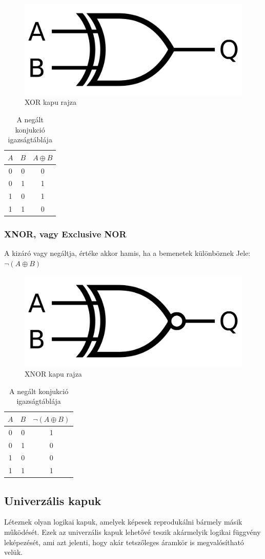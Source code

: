 \documentclass[
]{thesis-ekf}
\theoremstyle{definition}
\theoremstyle{remark}
\begin{document}
\begin{figure}[H]
	\centering
	\includegraphics[width=0.3\linewidth]{xor}
	\caption{XOR kapu rajza}
	\label{fig:xor}
\end{figure}


\begin{table}[H]
	\centering
	\begin{tabular}{c|c|c}
		$A$ & $B$ & $A \oplus B$\\               
		\hline
		0 & 0 & 0\\
		0 & 1 & 1\\
		1 & 0 & 1\\
		1 & 1 & 0
	\end{tabular}
	\caption{A negált konjukció igazságtáblája}
\end{table}


\subsubsection{XNOR, vagy Exclusive NOR}
A kizáró vagy negáltja, értéke akkor hamis, ha a bemenetek különböznek Jele: $\neg (A \oplus B)$

\begin{figure}[H]
	\centering
	\includegraphics[width=0.3\linewidth]{xnor}
	\caption{XNOR kapu rajza}
	\label{fig:xnor}
\end{figure}


\begin{table}[H]
	\centering
	\begin{tabular}{c|c|c}
		$A$ & $B$ & $\neg (A \oplus B)$\\               
		\hline
		0 & 0 & 1\\
		0 & 1 & 0\\
		1 & 0 & 0\\
		1 & 1 & 1
	\end{tabular}
	\caption{A negált konjukció igazságtáblája}
\end{table}

\subsection{Univerzális kapuk}
Léteznek olyan logikai kapuk, amelyek képesek reprodukálni bármely másik működését. Ezek az univerzális kapuk lehetővé teszik akármelyik logikai függvény leképezését, ami azt jelenti, hogy akár tetszőleges áramkör is megvalósítható velük.
\end{document}
